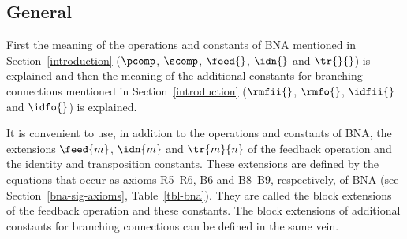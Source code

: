 \documentclass[fleqn]{llncs}
\begin{document}
\subsection{General}
\label{overview-general}
First the meaning of the operations and constants of BNA
mentioned in Section~\ref{introduction} ($\pcomp$, $\scomp$, $\feed{}$,
$\idn{}$ and $\tr{}{}$) is explained and then the meaning of the 
additional constants for branching connections mentioned in 
Section~\ref{introduction} ($\rmfii{}$, $\rmfo{}$, $\idfii{}$ and 
$\idfo{}$) is explained.

It is convenient to use, in addition to the operations and constants of
BNA, the extensions $\feed{m}$, $\idn{m}$ and $\tr{m}{n}$ of the
feedback operation and the identity and transposition constants.
These extensions are defined by the equations that occur as axioms 
R5--R6, B6 and B8--B9, respectively, of BNA 
(see Section~\ref{bna-sig-axioms}, Table~\ref{tbl-bna}).
They are called the block extensions of the feedback operation and these
constants.
The block extensions of additional constants for branching connections
can be defined in the same vein.
\end{document}

